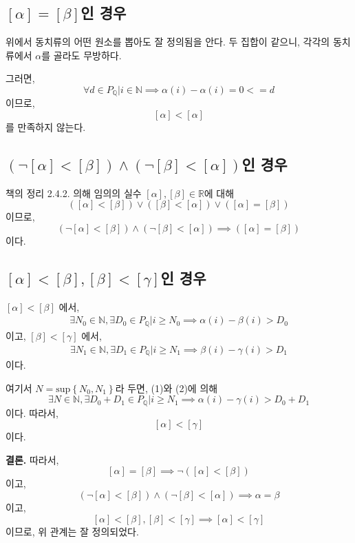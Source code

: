 \documentclass{article}
\begin{document}
\subsection{$[\alpha] = [\beta]$인 경우}
위에서 동치류의 어떤 원소를 뽑아도 잘 정의됨을 안다. 두 집합이 같으니, 각각의 동치류에서 $\alpha$를 골라도 무방하다.

그러면, $$\forall d \in P_\mathbb{Q} \bigg| i \in \mathbb{N} \implies \alpha(i) - \alpha(i) = 0 <= d$$
이므로, $$[\alpha] < [\alpha]$$를 만족하지 않는다.

\subsection{$(\neg [\alpha] < [\beta]) \wedge (\neg [\beta] < [\alpha])$인 경우}
책의 정리 2.4.2. 의해 임의의 실수 $[\alpha], [\beta] \in \mathbb{R}$에 대해
$$([\alpha] < [\beta]) \vee ([\beta] < [\alpha]) \vee ([\alpha] = [\beta])$$
이므로,
$$(\neg [\alpha] < [\beta]) \wedge (\neg [\beta] < [\alpha]) \implies ([\alpha] = [\beta])$$
이다.

\subsection{$[\alpha] < [\beta], [\beta] < [\gamma]$인 경우}
$[\alpha] < [\beta]$ 에서,
\begin{align*}
\exists N_0 \in \mathbb{N}, \exists D_0 \in P_\mathbb{Q} \bigg| i \ge N_0 \implies \alpha(i) - \beta(i) > D_0 \tag{1}
\end{align*}이고,
$[\beta] < [\gamma]$ 에서,
\begin{align*}
\exists N_1 \in \mathbb{N}, \exists D_1 \in P_\mathbb{Q} \bigg| i \ge N_1 \implies \beta(i) - \gamma(i) > D_1 \tag{2}
\end{align*}이다.

여기서 $N = \text{sup} \left\{N_0, N_1\right\}$라 두면, (1)와 (2)에 의해
$$\exists N \in \mathbb{N}, \exists D_0 + D_1 \in P_\mathbb{Q} \bigg| i \ge N_1 \implies \alpha(i) - \gamma(i) > D_0 + D_1$$이다. 따라서, $$[\alpha] < [\gamma]$$이다.

\textbf{결론.} 따라서, 
$$[\alpha] = [\beta] \implies \neg ([\alpha] < [\beta])$$
이고,
$$(\neg [\alpha] < [\beta]) \wedge (\neg [\beta] < [\alpha]) \implies \alpha = \beta$$
이고,
$$[\alpha] < [\beta], [\beta] < [\gamma] \implies [\alpha] < [\gamma]$$
이므로, 위 관계는 잘 정의되었다.
\end{document}
